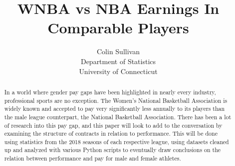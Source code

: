 \documentclass[12pt, titlepage]{article}
\title{WNBA vs NBA Earnings In Comparable Players}
\author{Colin Sullivan\\
  Department of Statistics\\
  University of Connecticut
}
\begin{document}
\maketitle

%
%            
%
%       
%
%
%            
%            
%     
%         
%            
\newpage

\begin{abstract}
In a world where gender pay gaps have been highlighted in nearly every industry, professional sports are no exception. The Women’s National Basketball 
Association is widely known and accepted to pay very significantly less annually to its players than the male league counterpart, the National Basketball 
Association. There has been a lot of research into this pay gap, and this paper will look to add to the conversation by examining the structure of 
contracts in relation to performance. This will be done using statistics from the 2018 seasons of each respective league, using datasets cleaned up and 
analyzed with various Python scripts to eventually draw conclusions on the relation between performance and pay for male and female athletes.	
\end{abstract}
\end{document}
